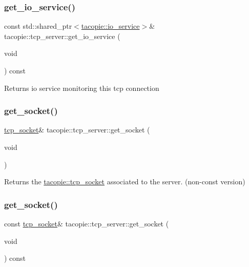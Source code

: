 \subsubsection{\texorpdfstring{get\+\_\+io\+\_\+service()}{get\_io\_service()}}
{\footnotesize\ttfamily const std\+::shared\+\_\+ptr$<$\hyperlink{classtacopie_1_1io__service}{tacopie\+::io\+\_\+service}$>$\& tacopie\+::tcp\+\_\+server\+::get\+\_\+io\+\_\+service (\begin{DoxyParamCaption}\item[{void}]{ }\end{DoxyParamCaption}) const}

\begin{DoxyReturn}{Returns}
io service monitoring this tcp connection 
\end{DoxyReturn}
\mbox{\label{classtacopie_1_1tcp__server_a39a51b9203d42babfd9c4c1a0f4cc340}} 
\subsubsection{\texorpdfstring{get\+\_\+socket()}{get\_socket()}\hspace{0.1cm}{\footnotesize\ttfamily [1/2]}}
{\footnotesize\ttfamily \hyperlink{classtacopie_1_1tcp__socket}{tcp\+\_\+socket}\& tacopie\+::tcp\+\_\+server\+::get\+\_\+socket (\begin{DoxyParamCaption}\item[{void}]{ }\end{DoxyParamCaption})}

\begin{DoxyReturn}{Returns}
the \hyperlink{classtacopie_1_1tcp__socket}{tacopie\+::tcp\+\_\+socket} associated to the server. (non-\/const version) 
\end{DoxyReturn}
\mbox{\label{classtacopie_1_1tcp__server_a373aec294e24a52c3ef6c44920af36e2}} 
\subsubsection{\texorpdfstring{get\+\_\+socket()}{get\_socket()}\hspace{0.1cm}{\footnotesize\ttfamily [2/2]}}
{\footnotesize\ttfamily const \hyperlink{classtacopie_1_1tcp__socket}{tcp\+\_\+socket}\& tacopie\+::tcp\+\_\+server\+::get\+\_\+socket (\begin{DoxyParamCaption}\item[{void}]{ }\end{DoxyParamCaption}) const}

